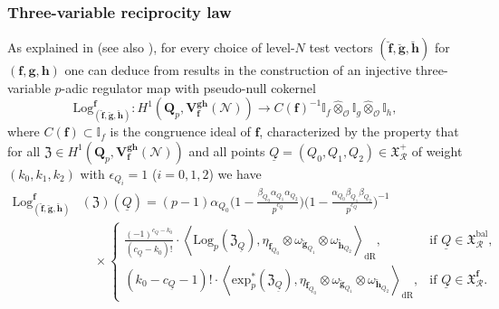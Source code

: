 \documentclass[10pt,letterpaper]{amsart}
\theoremstyle{plain}
\theoremstyle{definition}
\theoremstyle{definition}
\theoremstyle{plain}
\theoremstyle{plain}
\theoremstyle{plain}
\theoremstyle{remark}
\numberwithin{equation}{section}
\newcommand{\rH}{H}
\DeclareMathOperator{\bal}{\mathrm{bal}}
\def\cO{\mathcal O}
\newcommand{\Q}{\mathbf{Q}}
\newcommand{\cR}{\mathbb{I}}
\newcommand{\bff}{{\boldsymbol{f}}}
\newcommand{\bfg}{{\boldsymbol{g}}}
\newcommand{\bfh}{{\boldsymbol{h}}}
\begin{document}
\subsubsection{Three-variable reciprocity law} 

As explained in \cite[\S{7.3}]{BSV} (see also \cite[\S{5.1}]{DR3}), for every choice of level-$N$ test vectors $(\breve{\bff},\breve{\bfg},\breve{\bfh})$ for $(\bff,\bfg,\bfh)$ one can deduce from results %
in \cite{KLZ} the construction of an injective three-variable $p$-adic regulator map with pseudo-null cokernel
\begin{equation}\label{eq:Log}
{\mathrm{Log}}^\bff_{(\breve{\bff},\breve{\bfg},\breve{\bfh})}:\rH^1(\Q_p,\mathbf{V}_{\bff}^{\bfg\bfh}(\mathscr{N}))\rightarrow C(\bff)^{-1}\cR_f\hat\otimes_{\cO}\cR_g\hat\otimes_{\cO}\cR_h,
\end{equation}
where $C(\bff)\subset\cR_f$ is the congruence ideal of $\bff$, characterized by the property that for all $\mathfrak{Z}\in\rH^1(\Q_p,\mathbf{V}_{\bff}^{\bfg\bfh}(\mathscr{N}))$ and all points $\underline{Q}=(Q_0,Q_1,Q_2)\in\mathfrak{X}_{\mathcal{R}}^{+}$ of weight $(k_0,k_1,k_2)$ with $\epsilon_{Q_i}=1$ ($i=0,1,2$) we have
\begin{align*}
{\mathrm{Log}}^\bff_{(\breve{\bff},\breve{\bfg},\breve{\bfh})}&(\mathfrak{Z})(\underline{Q})=(p-1)\alpha_{Q_0}\biggl(1-\frac{\beta_{Q_0} \alpha_{Q_1} \alpha_{Q_2}}{p^{c_{\underline{Q}}}}\biggr)\biggl(1-\frac{\alpha_{Q_0} \beta_{Q_1}\beta_{Q_2}}{p^{c_{\underline{Q}}}}\biggr)^{-1}\\
&\quad\times\begin{cases}
\frac{(-1)^{c_{\underline{Q}}-k_0}}{(c_{\underline{Q}}-k_0)!}\cdot\left\langle{\mathrm{Log}}_p(\mathfrak{Z}_{\underline{Q}}),\eta_{\breve{\bff}_{Q_0}}\otimes\omega_{\breve{\bfg}_{Q_1}}\otimes\omega_{\breve{\bfh}_{Q_2}}\right\rangle_{\mathrm{dR}}, &\textrm{if $\underline{Q}\in\mathfrak{X}_{\mathcal{R}}^{\bal}$,}\\[0.5em]
(k_0-c_{\underline{Q}}-1)!\cdot\left\langle{\mathrm{exp}}_p^*(\mathfrak{Z}_{\underline{Q}}),\eta_{\breve{\bff}_{Q_0}}\otimes\omega_{\breve{\bfg}_{Q_1}}\otimes\omega_{\breve{\bfh}_{Q_2}}\right\rangle_{\mathrm{dR}},&\textrm{if $\underline{Q}\in\mathfrak{X}_{\mathcal{R}}^{\bff}$.}
\end{cases}
\end{align*}
\end{document}
